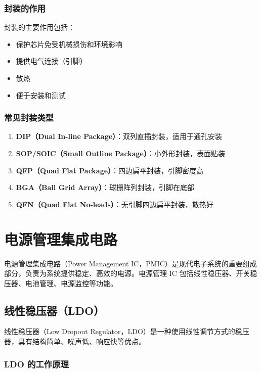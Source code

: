 \subsubsection{封装的作用}

封装的主要作用包括：
\begin{itemize}
  \item 保护芯片免受机械损伤和环境影响
  \item 提供电气连接（引脚）
  \item 散热
  \item 便于安装和测试
\end{itemize}

\subsubsection{常见封装类型}

\begin{enumerate}
  \item \textbf{DIP（Dual In-line Package）}：双列直插封装，适用于通孔安装
  \item \textbf{SOP/SOIC（Small Outline Package）}：小外形封装，表面贴装
  \item \textbf{QFP（Quad Flat Package）}：四边扁平封装，引脚密度高
  \item \textbf{BGA（Ball Grid Array）}：球栅阵列封装，引脚在底部
  \item \textbf{QFN（Quad Flat No-leads）}：无引脚四边扁平封装，散热好
\end{enumerate}

\section{电源管理集成电路}

电源管理集成电路（Power Management IC，PMIC）是现代电子系统的重要组成部分，负责为系统提供稳定、高效的电源。电源管理 IC 包括线性稳压器、开关稳压器、电池管理、电源监控等功能。

\subsection{线性稳压器（LDO）}

线性稳压器（Low Dropout Regulator，LDO）是一种使用线性调节方式的稳压器，具有结构简单、噪声低、响应快等优点。

\subsubsection{LDO 的工作原理}

